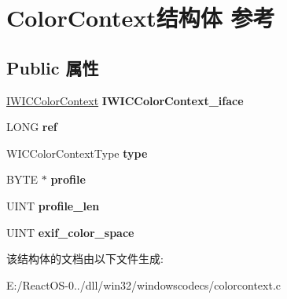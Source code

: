 \hypertarget{struct_color_context}{}\section{Color\+Context结构体 参考}
\label{struct_color_context}
\subsection*{Public 属性}
\begin{DoxyCompactItemize}
\item 
\mbox{\label{struct_color_context_adbf73da0fc669d4fe2ae2d76fa5b9de8}} 
\hyperlink{interface_i_w_i_c_color_context}{I\+W\+I\+C\+Color\+Context} {\bfseries I\+W\+I\+C\+Color\+Context\+\_\+iface}
\item 
\mbox{\label{struct_color_context_a496a77921cf00b37caf94b582ad1ae72}} 
L\+O\+NG {\bfseries ref}
\item 
\mbox{\label{struct_color_context_abea373ef6b2830a5903905ea5161ab43}} 
W\+I\+C\+Color\+Context\+Type {\bfseries type}
\item 
\mbox{\label{struct_color_context_aa93f13a221298e2c87253033fcb65a86}} 
B\+Y\+TE $\ast$ {\bfseries profile}
\item 
\mbox{\label{struct_color_context_a459bc3a4c5720f26f8d63f9a0be55f7c}} 
U\+I\+NT {\bfseries profile\+\_\+len}
\item 
\mbox{\label{struct_color_context_abab388a8b5c8a1c504dfa07e98c6bccf}} 
U\+I\+NT {\bfseries exif\+\_\+color\+\_\+space}
\end{DoxyCompactItemize}


该结构体的文档由以下文件生成\+:\begin{DoxyCompactItemize}
\item 
E\+:/\+React\+O\+S-\/0../dll/win32/windowscodecs/colorcontext.\+c\end{DoxyCompactItemize}
